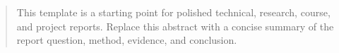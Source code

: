 \documentclass[UTF8,11pt,a4paper,openany]{ctexrep}
\begin{document}
\MakeReportTitle

\begin{abstract}
This template is a starting point for polished technical, research, course, and project reports.
Replace this abstract with a concise summary of the report question, method, evidence, and conclusion.
\end{abstract}

\tableofcontents
\listoffigures
\listoftables
\clearpage







\appendix




\end{document}
